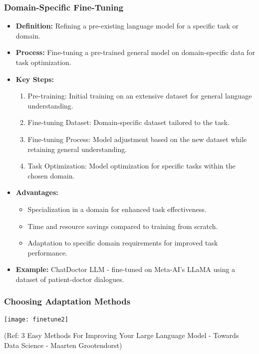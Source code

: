 \begin{frame}[fragile]\frametitle{Domain-Specific Fine-Tuning}
  \begin{itemize}
    \item \textbf{Definition:} Refining a pre-existing language model for a specific task or domain.
    \item \textbf{Process:} Fine-tuning a pre-trained general model on domain-specific data for task optimization.
    \item \textbf{Key Steps:}
      \begin{enumerate}
        \item Pre-training: Initial training on an extensive dataset for general language understanding.
        \item Fine-tuning Dataset: Domain-specific dataset tailored to the task.
        \item Fine-tuning Process: Model adjustment based on the new dataset while retaining general understanding.
        \item Task Optimization: Model optimization for specific tasks within the chosen domain.
      \end{enumerate}
    \item \textbf{Advantages:}
      \begin{itemize}
        \item Specialization in a domain for enhanced task effectiveness.
        \item Time and resource savings compared to training from scratch.
        \item Adaptation to specific domain requirements for improved task performance.
      \end{itemize}
    \item \textbf{Example:} ChatDoctor LLM - fine-tuned on Meta-AI's LLaMA using a dataset of patient-doctor dialogues.
  \end{itemize}
\end{frame}

\begin{frame}[fragile]\frametitle{Choosing Adaptation Methods}


		\begin{center}
		\texttt{[image: finetune2]}
		\end{center}

{\tiny (Ref: 3 Easy Methods For Improving Your Large Language Model - Towards Data Science - Maarten Grootendorst)}

\end{frame}


